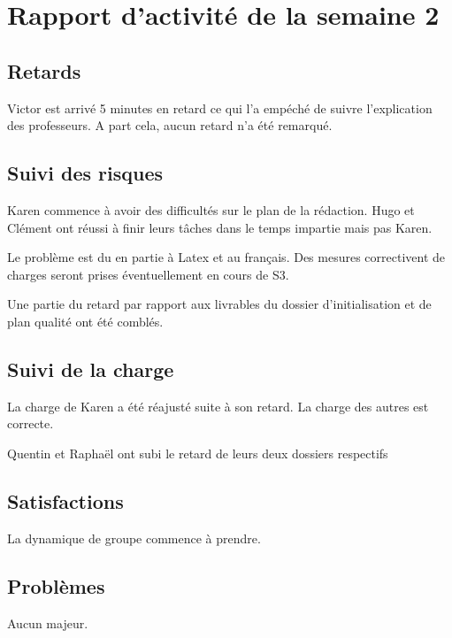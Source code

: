 \section{Rapport d'activité de la semaine 2}

\subsection{Retards}

Victor est arrivé 5 minutes en retard ce qui l'a empéché de suivre l'explication des professeurs. A part cela, aucun retard n'a été remarqué. 

\subsection{Suivi des risques}

Karen commence à avoir des difficultés sur le plan de la rédaction. 
Hugo et Clément ont réussi à finir leurs tâches dans le temps impartie mais pas Karen. 

Le problème est du en partie à Latex et au français. Des mesures correctivent de charges seront prises éventuellement en cours de S3. 

Une partie du retard par rapport aux livrables du dossier d'initialisation et de plan qualité ont été comblés.

\subsection{Suivi de la charge}

La charge de Karen a été réajusté suite à son retard. La charge des autres est correcte.

Quentin et Raphaël ont subi le retard de leurs deux dossiers respectifs

\subsection{Satisfactions}

La dynamique de groupe commence à prendre. 

\subsection{Problèmes}

Aucun majeur.
